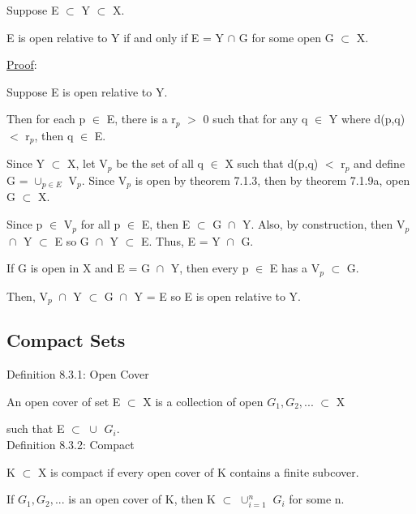 	\begin{adjustbox}{minipage=14cm, right, vspace=0.1cm 0cm}
		Suppose E $\subset$ Y $\subset$ X.

		E is open relative to Y if and only if E = Y $\cap$ G
		for some open G $\subset$ X.
	\end{adjustbox}

{ \color{magenta} \underline{Proof}: } 

	Suppose E is open relative to Y.

	Then for each p $\in$ E, there is a r$_p$ $>$ 0 such that for
	any q $\in$ Y where d(p,q) $<$ r$_p$, then q $\in$ E.
	
	Since Y $\subset$ X, let V$_p$ be the set of all q $\in$ X
	such that d(p,q) $<$ r$_p$ and define G = $\cup_{p \in E}^{}$ V$_p$.
	Since V$_p$ is open by {\color{red} theorem 7.1.3}, then by
	{\color{red} theorem 7.1.9a}, open G $\subset$ X.

	Since p $\in$ V$_p$ for all p $\in$ E, then E $\subset$ G $\cap_{}^{}$ Y.
	Also, by construction, then V$_p$ $\cap_{}^{}$ Y $\subset$ E so
	G $\cap_{}^{}$ Y $\subset$ E.
	Thus, E = Y $\cap_{}^{}$ G.

	If G is open in X and E = G $\cap_{}^{}$ Y, then every p $\in$ E has
	a V$_p$ $\subset$ G.

	Then, V$_p$ $\cap_{}^{}$ Y $\subset$ G $\cap_{}^{}$ Y = E so
	E is open relative to Y.





\subsection{ Compact Sets }

{ \color{blue} Definition 8.3.1: Open Cover } 

	\begin{adjustbox}{minipage=14cm, right, vspace=0.1cm 0cm}
		An open cover of set E $\subset$ X is a collection of open $G_1, G_2, ...$
		$\subset$ X
		
		such that E $\subset$ $\cup_{}^{}$ $G_i$. \\
	\end{adjustbox}

{ \color{blue} Definition 8.3.2: Compact } 

	\begin{adjustbox}{minipage=14cm, right, vspace=0.1cm 0cm}
		K $\subset$ X is compact if every open cover
		of K contains a finite subcover.

		\qquad If $G_1, G_2, ...$ is an open cover of K, then
		K $\subset$ $\cup_{i=1}^{n}$ $G_i$ for some n. \\
	\end{adjustbox}

